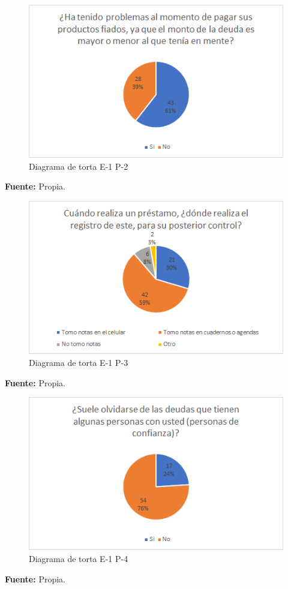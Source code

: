 {{		\begin{figure}[H]
			\centering
			\includegraphics[width=0.8\linewidth]{annexes/e1-p2.png}
			\caption{Diagrama de torta E-1 P-2}
		\end{figure}
		\begin{center}
			\textbf{Fuente:} Propia.
		\end{center}
	
		\begin{figure}[H]
			\centering
			\includegraphics[width=0.8\linewidth]{annexes/e1-p3.png}
			\caption{Diagrama de torta E-1 P-3}
		\end{figure}
		\begin{center}
			\textbf{Fuente:} Propia.
		\end{center}
	
		\begin{figure}[H]
			\centering
			\includegraphics[width=0.8\linewidth]{annexes/e1-p4.png}
			\caption{Diagrama de torta E-1 P-4}
		\end{figure}
		\begin{center}
			\textbf{Fuente:} Propia.
		\end{center}
	
}}
